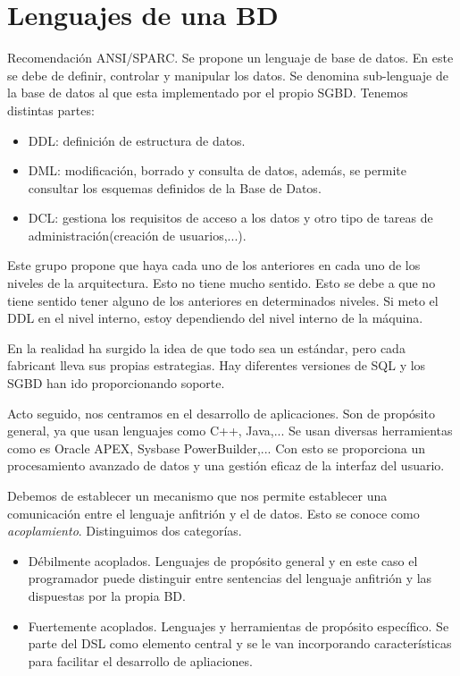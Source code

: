\section{Lenguajes de una BD}

Recomendación ANSI/SPARC. Se propone un lenguaje de base de datos. En este se debe de definir, controlar y manipular los datos. Se denomina sub-lenguaje de la base de datos al que esta implementado por el propio SGBD. Tenemos distintas partes:
\begin{itemize}
    \item DDL: definición de estructura de datos.
    \item DML: modificación, borrado y consulta de datos, además, se permite consultar los esquemas definidos de la Base de Datos.
    \item DCL: gestiona los requisitos de acceso a los datos y otro tipo de tareas de administración(creación de usuarios,...).
\end{itemize}

Este grupo propone que haya cada uno de los anteriores en cada uno de los niveles de la arquitectura. Esto no tiene mucho sentido. Esto se debe a que no tiene sentido tener alguno de los anteriores en determinados niveles. Si meto el DDL en el nivel interno, estoy dependiendo del nivel interno de la máquina.

En la realidad ha surgido la idea de que todo sea un estándar, pero cada fabricant lleva sus propias estrategias. Hay diferentes versiones de SQL y los SGBD han ido proporcionando soporte.

Acto seguido, nos centramos en el desarrollo de aplicaciones. Son de propósito general, ya que usan lenguajes como C++, Java,... Se usan diversas herramientas como es Oracle APEX, Sysbase PowerBuilder,... Con esto se proporciona un procesamiento avanzado de datos y una gestión eficaz de la interfaz del usuario.

Debemos de establecer un mecanismo que nos permite establecer una comunicación entre el lenguaje anfitrión y el de datos. Esto se conoce como \textit{acoplamiento}. Distinguimos dos categorías.
\begin{itemize}
    \item Débilmente acoplados. Lenguajes de propósito general y en este caso el programador puede distinguir entre sentencias del lenguaje anfitrión y las dispuestas por la propia BD.
    \item Fuertemente acoplados. Lenguajes y herramientas de propósito específico. Se parte del DSL como elemento central y se le van incorporando características para facilitar el desarrollo de apliaciones.
\end{itemize}

